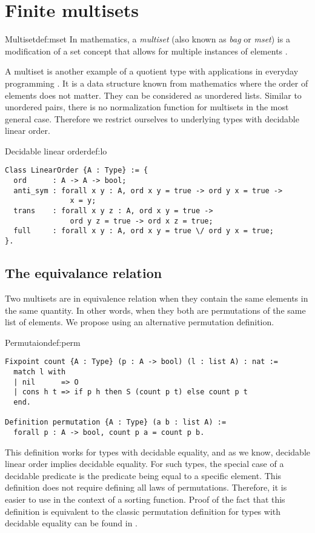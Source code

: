 \section{Finite multisets}
\begin{defi}{Multiset}{def:mset}
In mathematics, a \emph{multiset} (also known as \emph{bag} or \emph{mset}) is a modification of a set concept that allows for multiple instances of elements \cite{SetTheorey}.
\end{defi}
A multiset is another example of a quotient type with applications in everyday programming \cite{MSetApplic}. It is a data structure known from mathematics where the order of elements does not matter. They can be considered as unordered lists. Similar to unordered pairs, there is no normalization function for multisets in the most general case. Therefore we restrict ourselves to underlying types with decidable linear order.
\begin{defi}{Decidable linear order}{def:lo}
\begin{verbatim}
Class LinearOrder {A : Type} := {
  ord      : A -> A -> bool;
  anti_sym : forall x y : A, ord x y = true -> ord y x = true ->
               x = y;
  trans    : forall x y z : A, ord x y = true -> 
               ord y z = true -> ord x z = true;
  full     : forall x y : A, ord x y = true \/ ord y x = true;
}.
\end{verbatim}
\end{defi}
\subsection{The equivalance relation}
Two multisets are in equivalence relation when they contain the same elements in the same quantity. In other words, when they both are permutations of the same list of elements. We propose using an alternative permutation definition. 
\begin{defi}{Permutaion}{def:perm}
\begin{verbatim}
Fixpoint count {A : Type} (p : A -> bool) (l : list A) : nat :=
  match l with
  | nil      => O
  | cons h t => if p h then S (count p t) else count p t
  end.

Definition permutation {A : Type} (a b : list A) :=
  forall p : A -> bool, count p a = count p b.
\end{verbatim}
\end{defi}
This definition works for types with decidable equality, and as we know, decidable linear order implies decidable equality. For such types, the special case of a decidable predicate is the predicate being equal to a specific element. This definition does not require defining all laws of permutations. Therefore, it is easier to use in the context of a sorting function. Proof of the fact that this definition is equivalent to the classic permutation definition for types with decidable equality can be found in .
